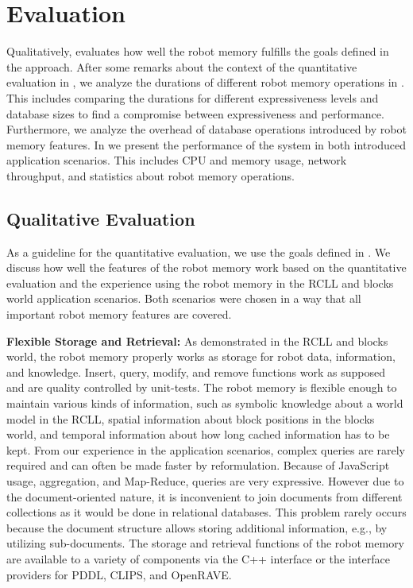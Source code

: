 \chapter{Evaluation}
\label{chap:evaluation}
Qualitatively,  evaluates
how well the robot memory fulfills the goals defined in the approach.
After some remarks about the context of the quantitative evaluation in , we
analyze the durations of different robot memory operations in
. This includes comparing the durations for
different expressiveness levels and database sizes to find a
compromise between expressiveness and performance. Furthermore, we
analyze the overhead of database operations introduced by robot memory
features. In  we present the performance of
the system in both introduced application scenarios. This includes CPU
and memory usage, network throughput, and statistics about robot
memory operations.

\section{Qualitative Evaluation}
\label{sec:qualitative}
As a guideline for the quantitative evaluation, we use the goals defined
in . We discuss how well the
features of the robot memory work based on the quantitative evaluation
and the experience using the robot memory in the RCLL and
blocks world application scenarios. Both scenarios were chosen in a
way that all important robot memory features are covered.


\textbf{Flexible Storage and Retrieval:}
As demonstrated in the RCLL and blocks world, the robot memory
properly works as storage for robot data, information,
and knowledge. Insert, query, modify, and remove functions work as
supposed and are quality controlled by unit-tests. The robot memory is flexible
enough to maintain various kinds of information, such as symbolic knowledge
about a world model in the RCLL, spatial information about block
positions in the blocks world, and temporal information about how long
cached information has to be kept.
From our experience in the application scenarios, complex
queries are rarely required and can often be made faster by
reformulation.  Because of JavaScript usage, aggregation, and
Map-Reduce, queries are very expressive.
However due to the document-oriented nature, it is
inconvenient to join documents from different collections as it would
be done in relational databases. This problem rarely occurs because
the document structure allows
storing additional information, e.g., by utilizing sub-documents.
The storage and retrieval functions of the robot memory are available
to a variety of components via the C++ interface or the interface
providers for PDDL, CLIPS, and OpenRAVE.

